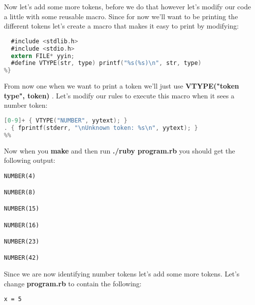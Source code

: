 Now let's add some more tokens, before we do that however let's modify our code a little with some reusable macro. Since for now we'll want to be printing the different tokens let's create a macro that makes it easy to print by modifying:

\begin{lstlisting}[language=C]
%{
  #include <stdlib.h>
  #include <stdio.h>
  extern FILE* yyin;
  #define VTYPE(str, type) printf("%s(%s)\n", str, type)
%}
\end{lstlisting}

From now one when we want to print a token we'll just use {\bf VTYPE("token type", token) }. Let's modify our rules to execute this macro when it sees a number token:


\begin{lstlisting}[language=C]
%%
[0-9]+ { VTYPE("NUMBER", yytext); }
. { fprintf(stderr, "\nUnknown token: %s\n", yytext); }
%%
\end{lstlisting}

Now when you {\bf make} and then run {\bf ./ruby program.rb} you should get the following output:

\begin{lstlisting}
NUMBER(4)

NUMBER(8)

NUMBER(15)

NUMBER(16)

NUMBER(23)

NUMBER(42)

\end{lstlisting}

Since we are now identifying number tokens let's add some more tokens. Let's change {\bf program.rb} to contain the following:

\begin{lstlisting}
x = 5
\end{lstlisting}
